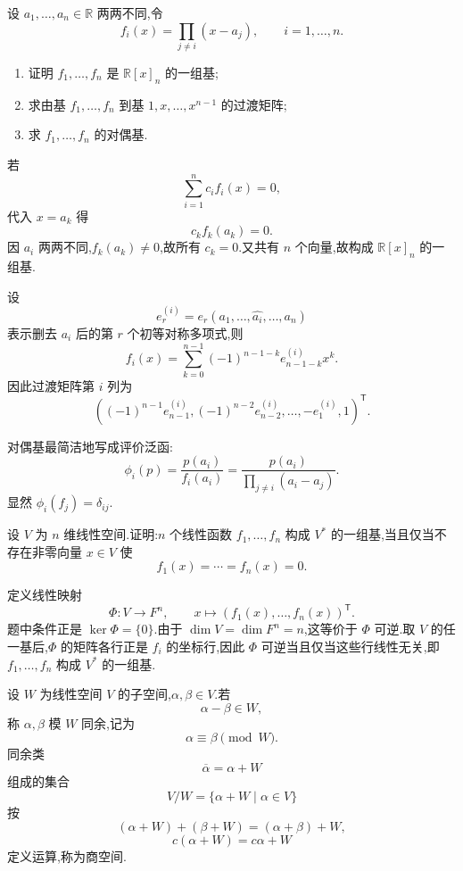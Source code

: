 \begin{example}
设 $a_1,\ldots,a_n\in\mathbb{R}$ 两两不同,令
\[
f_i(x)=\prod_{j\neq i}(x-a_j),
\qquad i=1,\ldots,n.
\]
\begin{enumerate}
  \item 证明 $f_1,\ldots,f_n$ 是 $\mathbb{R}[x]_n$ 的一组基;
  \item 求由基 $f_1,\ldots,f_n$ 到基 $1,x,\ldots,x^{n-1}$ 的过渡矩阵;
  \item 求 $f_1,\ldots,f_n$ 的对偶基.
\end{enumerate}
\end{example}
\exampleblank

\begin{solution}
若
\[
\displaystyle\sum\limits_{i=1}^n c_if_i(x)=0,
\]
代入 $x=a_k$ 得
\[
c_kf_k(a_k)=0.
\]
因 $a_i$ 两两不同,$f_k(a_k)\neq0$,故所有 $c_k=0$.又共有 $n$ 个向量,故构成 $\mathbb{R}[x]_n$ 的一组基.

设
\[
e_r^{(i)}
=
 e_r(a_1,\ldots,\widehat{a_i},\ldots,a_n)
\]
表示删去 $a_i$ 后的第 $r$ 个初等对称多项式,则
\[
f_i(x)
=
\sum\limits_{k=0}^{n-1}
(-1)^{n-1-k}e_{n-1-k}^{(i)}x^k.
\]
因此过渡矩阵第 $i$ 列为
\[
\left(
(-1)^{n-1}e_{n-1}^{(i)},
(-1)^{n-2}e_{n-2}^{(i)},
\ldots,
-e_1^{(i)},
1
\right)^{\mathsf T}.
\]

对偶基最简洁地写成评价泛函:
\[
\boxed{
\phi_i(p)
=
\dfrac{p(a_i)}{f_i(a_i)}
=
\dfrac{p(a_i)}{\displaystyle\prod_{j\neq i}(a_i-a_j)}
}.
\]
显然 $\phi_i(f_j)=\delta_{ij}$.
\end{solution}

\begin{example}
设 $V$ 为 $n$ 维线性空间.证明:$n$ 个线性函数 $f_1,\ldots,f_n$ 构成 $V^*$ 的一组基,当且仅当不存在非零向量 $x\in V$ 使
\[
f_1(x)=\cdots=f_n(x)=0.
\]
\end{example}
\exampleblank

\begin{solution}
定义线性映射
\[
\Phi:V\to F^n,
\qquad
x\longmapsto(f_1(x),\ldots,f_n(x))^{\mathsf T}.
\]
题中条件正是 $\ker\Phi=\{0\}$.由于 $\dim V=\dim F^n=n$,这等价于 $\Phi$ 可逆.取 $V$ 的任一基后,$\Phi$ 的矩阵各行正是 $f_i$ 的坐标行,因此 $\Phi$ 可逆当且仅当这些行线性无关,即 $f_1,\ldots,f_n$ 构成 $V^*$ 的一组基.
\end{solution}

\begin{definition}
设 $W$ 为线性空间 $V$ 的子空间,$\alpha,\beta\in V$.若
\[
\alpha-\beta\in W,
\]
称 $\alpha,\beta$ 模 $W$ 同余,记为
\[
\alpha\equiv\beta\pmod W.
\]
同余类
\[
\overline\alpha=\alpha+W
\]
组成的集合
\[
V/W=\{\alpha+W\mid\alpha\in V\}
\]
按
\[
(\alpha+W)+(\beta+W)=(\alpha+\beta)+W,
\]
\[
c(\alpha+W)=c\alpha+W
\]
定义运算,称为商空间.
\end{definition}

